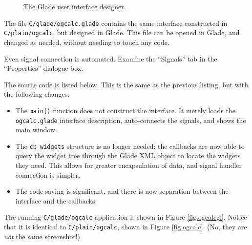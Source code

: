 \documentclass[a4paper,oneside]{article}
\newcommand{\filename}[1]{\texttt{#1}}
\newcommand{\program}[1]{\texttt{#1}}
\newcommand{\class}[1]{\texttt{#1}}
\newcommand{\function}[1]{\texttt{#1()}}
\begin{document}
\begin{figure}
{{    }
    \label{fig:glade:tree}
  }
  \caption[The Glade user interface designer]{The Glade user interface
    designer.}
  \label{fig:glade}
\end{figure}

The file \filename{C/glade/ogcalc.glade} contains the same interface
constructed in \program{C/plain/ogcalc}, but designed in Glade.  This
file can be opened in Glade, and changed as needed, without needing to
touch any code.

Even signal connection is automated.  Examine the ``Signals'' tab in
the ``Properties'' dialogue box.

The source code is listed below.  This is the same as the previous
listing, but with the following changes:

\begin{itemize}
\item The \function{main} function does not construct the interface.
  It merely loads the \filename{ogcalc.glade} interface description,
  auto-connects the signals, and shows the main window.
\item The \class{cb\_widgets} structure is no longer needed: the
  callbacks are now able to query the widget tree through the Glade
  XML object to locate the widgets they need.  This allows for greater
  encapsulation of data, and signal handler connection is simpler.
\item The code saving is significant, and there is now separation
  between the interface and the callbacks.
\end{itemize}

The running \program{C/glade/ogcalc} application is shown in Figure
\ref{fig:ogcalcgl}.  Notice that it is identical to
\program{C/plain/ogcalc}, shown in Figure \ref{fig:ogcalc}.  (No, they
are \emph{not} the same screenshot!)
\end{document}

